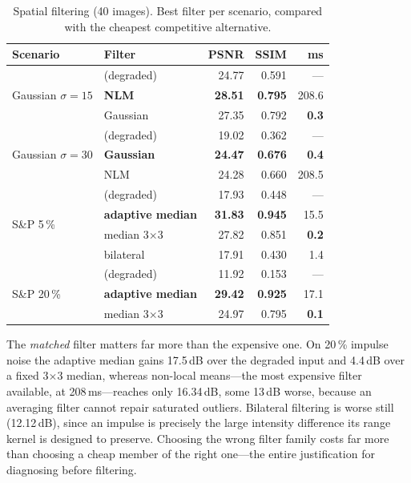 \documentclass[conference,10pt]{IEEEtran}
\newcommand{\hdr}[1]{\textbf{#1}}
\begin{document}
\begin{table}[!t]
\caption{Spatial filtering (40 images). Best filter per scenario, compared with
the cheapest competitive alternative.}
\label{tab:spatial}
\centering
\scriptsize
\begin{tabular}{@{}llrrr@{}}
\toprule
\hdr{Scenario} & \hdr{Filter} & \hdr{PSNR} & \hdr{SSIM} & \hdr{ms} \\
\midrule
\multirow{3}{*}{Gaussian $\sigma{=}15$}
 & (degraded)        & 24.77 & 0.591 & --- \\
 & \textbf{NLM}      & \textbf{28.51} & \textbf{0.795} & 208.6 \\
 & Gaussian          & 27.35 & 0.792 & \textbf{0.3} \\
\midrule
\multirow{3}{*}{Gaussian $\sigma{=}30$}
 & (degraded)        & 19.02 & 0.362 & --- \\
 & \textbf{Gaussian} & \textbf{24.47} & \textbf{0.676} & \textbf{0.4} \\
 & NLM               & 24.28 & 0.660 & 208.5 \\
\midrule
\multirow{4}{*}{S\&P 5\,\%}
 & (degraded)        & 17.93 & 0.448 & --- \\
 & \textbf{adaptive median} & \textbf{31.83} & \textbf{0.945} & 15.5 \\
 & median 3$\times$3 & 27.82 & 0.851 & \textbf{0.2} \\
 & bilateral         & 17.91 & 0.430 & 1.4 \\
\midrule
\multirow{3}{*}{S\&P 20\,\%}
 & (degraded)        & 11.92 & 0.153 & --- \\
 & \textbf{adaptive median} & \textbf{29.42} & \textbf{0.925} & 17.1 \\
 & median 3$\times$3 & 24.97 & 0.795 & \textbf{0.1} \\
\bottomrule
\end{tabular}
\end{table}

The \emph{matched} filter matters far more than the expensive one. On 20\,\%
impulse noise the adaptive median gains 17.5\,dB over the degraded input and
4.4\,dB over a fixed 3$\times$3 median, whereas non-local means---the most
expensive filter available, at 208\,ms---reaches only 16.34\,dB, some 13\,dB
worse, because an averaging filter cannot repair saturated outliers. Bilateral
filtering is worse still (12.12\,dB), since an impulse is precisely the large
intensity difference its range kernel is designed to preserve. Choosing the
wrong filter family costs far more than choosing a cheap member of the right
one---the entire justification for diagnosing before filtering.
\end{document}
